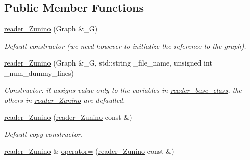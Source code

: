 \subsection*{Public Member Functions}
\begin{DoxyCompactItemize}
\item 
\hypertarget{classreader__Zunino_aec835fd3eef0b46931b2b7f5c1adc406}{
\hyperlink{classreader__Zunino_aec835fd3eef0b46931b2b7f5c1adc406}{reader\_\-Zunino} (Graph \&\_\-G)}
\label{classreader__Zunino_aec835fd3eef0b46931b2b7f5c1adc406}

\begin{DoxyCompactList}\small\item\em Default constructor (we need however to initialize the reference to the graph). \item\end{DoxyCompactList}\item 
\hypertarget{classreader__Zunino_a87721ab95888dc02124aaab4bf3f76e0}{
\hyperlink{classreader__Zunino_a87721ab95888dc02124aaab4bf3f76e0}{reader\_\-Zunino} (Graph \&\_\-G, std::string \_\-file\_\-name, unsigned int \_\-num\_\-dummy\_\-lines)}
\label{classreader__Zunino_a87721ab95888dc02124aaab4bf3f76e0}

\begin{DoxyCompactList}\small\item\em Constructor: it assigns value only to the variables in \hyperlink{classreader__base__class}{reader\_\-base\_\-class}, the others in \hyperlink{classreader__Zunino}{reader\_\-Zunino} are defaulted. \item\end{DoxyCompactList}\item 
\hypertarget{classreader__Zunino_af74c53fdb0cee088786b93f1a0ae525c}{
\hyperlink{classreader__Zunino_af74c53fdb0cee088786b93f1a0ae525c}{reader\_\-Zunino} (\hyperlink{classreader__Zunino}{reader\_\-Zunino} const \&)}
\label{classreader__Zunino_af74c53fdb0cee088786b93f1a0ae525c}

\begin{DoxyCompactList}\small\item\em Default copy constructor. \item\end{DoxyCompactList}\item 
\hypertarget{classreader__Zunino_a01da0def6b34fb69aa51d3fa9b58a1ec}{
\hyperlink{classreader__Zunino}{reader\_\-Zunino} \& \hyperlink{classreader__Zunino_a01da0def6b34fb69aa51d3fa9b58a1ec}{operator=} (\hyperlink{classreader__Zunino}{reader\_\-Zunino} const \&)}
\label{classreader__Zunino_a01da0def6b34fb69aa51d3fa9b58a1ec}


\end{DoxyCompactItemize}
